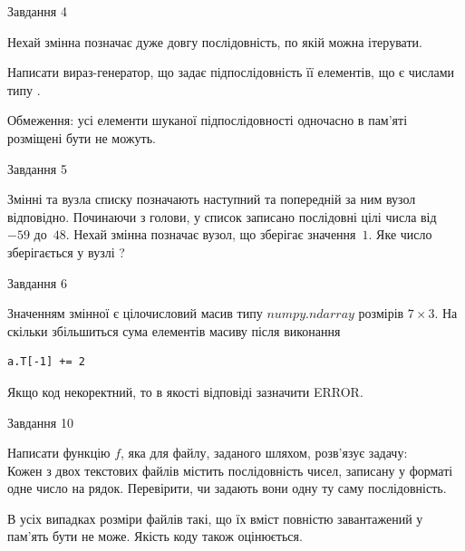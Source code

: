 \documentclass[12pt, ukrainian]{article}
\begin{document}
{               
{\begin{center}Завдання {4}\end{center}}
\vspace{-6mm}
Нехай змінна  позначає дуже довгу послідовність, по якій можна ітерувати.

Написати вираз-генератор, що задає підпослідовність її елементів, що є числами типу .

Обмеження: усі елементи шуканої підпослідовності одночасно в пам'яті розміщені бути не можуть.\par

\vspace{10mm}
               
{\begin{center}Завдання {5}\end{center}}
\vspace{-6mm}
Змінні  та  вузла списку позначають наступний та попередній за ним вузол відповідно. Починаючи з голови, у список записано послідовні цілі числа від~$-59$ до~$48$. Нехай змінна  позначає вузол, що зберігає значення~$1$.
Яке число зберігається у вузлі  ?\par

               
{\begin{center}Завдання {6}\end{center}}
\vspace{-6mm}
Значенням змінної  є цілочисловий масив типу $numpy.ndarray$ розмірів $7{\times}3$. На скільки збільшиться сума елементів масиву  після виконання
\begin{verbatim}
a.T[-1] += 2
\end{verbatim}


Якщо код некоректний, то в якості відповіді зазначити ERROR.\par

               
{\begin{center}Завдання {10}\end{center}}
\vspace{-6mm}

Написати функцію $f$, яка для файлу, заданого шляхом, розв’язує задачу:\\ Кожен з двох текстових файлів містить послідовність чисел, записану у форматі одне число на рядок.  Перевірити, чи задають вони одну ту саму послідовність.

В усіх випадках розміри файлів такі, що їх вміст повністю завантажений у пам'ять бути не може. Якість коду також оцінюється.



}
\end{document}

